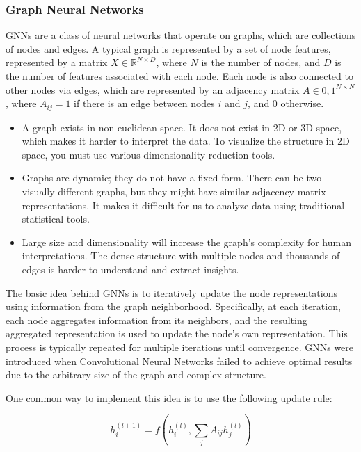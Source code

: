 \subsubsection{Graph Neural Networks}
\label{subsubsec:3_gnns}

GNNs are a class of neural networks that operate on graphs, which are collections of nodes and edges. A typical graph is represented by a set of node features, represented by a matrix $X \in \mathbb{R}^{N \times D}$, where $N$ is the number of nodes, and $D$ is the number of features associated with each node. Each node is also connected to other nodes via edges, which are represented by an adjacency matrix $A \in {0,1}^{N \times N}$, where $A_{ij} = 1$ if there is an edge between nodes $i$ and $j$, and $0$ otherwise.

\begin{itemize}
	\item A graph exists in non-euclidean space. It does not exist in 2D or 3D space, which makes it harder to interpret the data. To visualize the structure in 2D space, you must use various dimensionality reduction tools.
	\item Graphs are dynamic; they do not have a fixed form. There can be two visually different graphs, but they might have similar adjacency matrix representations. It makes it difficult for us to analyze data using traditional statistical tools.
	\item Large size and dimensionality will increase the graph's complexity for human interpretations. The dense structure with multiple nodes and thousands of edges is harder to understand and extract insights. 
\end{itemize}

The basic idea behind GNNs is to iteratively update the node representations using information from the graph neighborhood. Specifically, at each iteration, each node aggregates information from its neighbors, and the resulting aggregated representation is used to update the node's own representation. This process is typically repeated for multiple iterations until convergence. GNNs were introduced when Convolutional Neural Networks failed to achieve optimal results due to the arbitrary size of the graph and complex structure. 

One common way to implement this idea is to use the following update rule:

\begin{equation}
h_i^{(l+1)} = f(h_i^{(l)}, \sum_{j} A_{ij} h_j^{(l)})
\end{equation}

